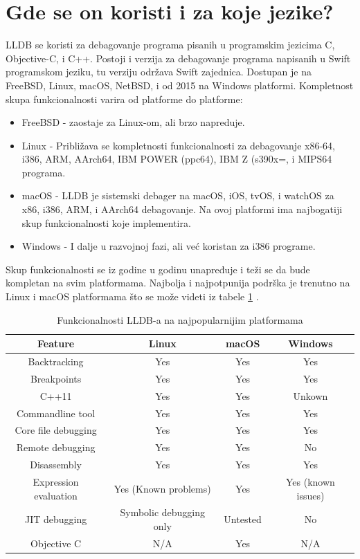 \documentclass[a4paper]{article}
\begin{document}
\section{Gde se on koristi i za koje jezike? }
\label{sec: Gde se on koristi i za koje jezike?}
LLDB se koristi za debagovanje programa pisanih u programskim jezicima C, Objective-C, i C++. Postoji i verzija za debagovanje programa napisanih u Swift programskom jeziku, tu verziju održava Swift zajednica. 
Dostupan je na FreeBSD, Linux, macOS, NetBSD, i od 2015 na Windows platformi. Kompletnost skupa funkcionalnosti varira od platforme do platforme\cite{lldb_status}:
\begin{itemize}
\item FreeBSD - zaostaje za Linux-om, ali brzo napreduje.
\item Linux - Približava se kompletnosti funkcionalnosti za debagovanje x86-64, i386, ARM, AArch64, IBM POWER (ppc64), IBM Z (s390x=, i MIPS64 programa.
\item macOS - LLDB je sistemski debager na macOS, iOS, tvOS, i watchOS za x86, i386, ARM, i AArch64 debagovanje. Na ovoj platformi ima najbogatiji skup funkcionalnosti koje implementira.
\item Windows - I dalje u razvojnoj fazi, ali već koristan za i386 programe.
\end{itemize}
Skup funkcionalnosti se iz godine u godinu unapređuje i teži se da bude kompletan na svim platformama. Najbolja i najpotpunija podrška je trenutno na Linux i macOS platformama što se može videti iz tabele \ref{tab:table lldb features} \cite{lldb_status}.

\begin{table}[h!]
\center
\caption{Funkcionalnosti LLDB-a na najpopularnijim platformama}
\label{tab:table lldb features}
\begin{tabular}{|c|c c c|} 
 \hline
 Feature & Linux & macOS & Windows \\ [0.5ex] 
 \hline
 Backtracking & Yes & Yes & Yes \\ 
 Breakpoints & Yes & Yes & Yes \\
 C++11 & Yes & Yes & Unkown \\
 Commandline tool & Yes & Yes & Yes \\
 Core file debugging  & Yes & Yes & Yes \\
  Remote debugging & Yes & Yes & No\\ [1ex] 
 Disassembly & Yes & Yes & Yes  \\
 Expression evaluation & Yes (Known problems)& Yes & Yes (known issues) \\
 JIT debugging & Symbolic debugging only & Untested & No \\
 Objective C & N/A & Yes & N/A \\
 \hline
\end{tabular}
\end{table}
\end{document}
